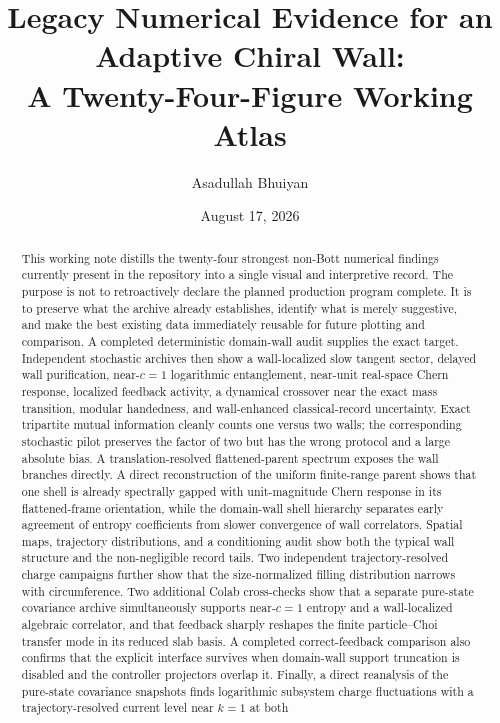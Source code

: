 \documentclass[aps,prb,twocolumn,floatfix,nofootinbib,superscriptaddress]{revtex4-2}
\begin{document}
\title{Legacy Numerical Evidence for an Adaptive Chiral Wall:\texorpdfstring{\\}{ }
A Twenty-Four-Figure Working Atlas}
\author{Asadullah Bhuiyan}
\date{August 17, 2026}

\begin{abstract}
This working note distills the twenty-four strongest non-Bott numerical findings currently
present in the repository into a single visual and interpretive record.  The purpose is
not to retroactively declare the planned production program complete.  It is to preserve
what the archive already establishes, identify what is merely suggestive, and make the
best existing data immediately reusable for future plotting and comparison.  A completed
deterministic domain-wall audit supplies the exact target.  Independent stochastic
archives then show a wall-localized slow tangent sector, delayed wall purification,
near-$c=1$ logarithmic entanglement, near-unit real-space Chern response, localized
feedback activity, a dynamical crossover near the exact mass transition, modular
handedness, and wall-enhanced classical-record uncertainty.  Exact tripartite mutual
information cleanly counts one versus two walls; the corresponding stochastic pilot
preserves the factor of two but has the wrong protocol and a large absolute bias.  A
translation-resolved flattened-parent spectrum exposes the wall branches directly.  A
direct reconstruction of the uniform finite-range parent shows that one shell is already
spectrally gapped with unit-magnitude Chern response in its flattened-frame orientation,
while the domain-wall shell hierarchy separates
early agreement of entropy coefficients from slower convergence of wall correlators.
Spatial maps, trajectory distributions, and a
conditioning audit show both the typical wall structure and the non-negligible record
tails.  Two independent trajectory-resolved charge campaigns further show that the
size-normalized filling distribution narrows with circumference.  Two additional Colab
cross-checks show that a separate pure-state covariance archive simultaneously supports
near-$c=1$ entropy and a wall-localized algebraic correlator, and that feedback sharply
reshapes the finite particle--Choi transfer mode in its reduced slab basis.  A completed
correct-feedback comparison also confirms that the explicit interface survives when
domain-wall support truncation is disabled and the controller projectors overlap it.
Finally, a direct reanalysis of the pure-state covariance snapshots finds logarithmic
subsystem charge fluctuations with a trajectory-resolved current level near $k=1$ at both

\end{abstract}
\end{document}

